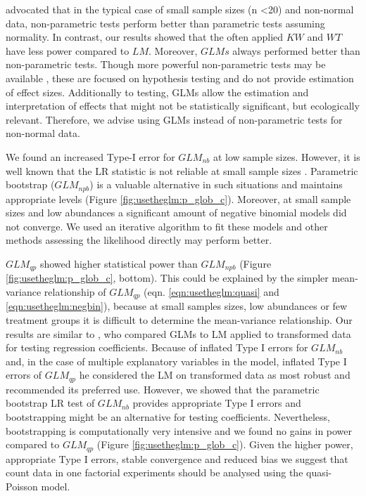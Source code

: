 \citet{wang_making_2011} advocated that in the typical case of small sample sizes (n \textless 20) and non-normal data, non-parametric tests perform better than parametric tests assuming normality.
In contrast, our results showed that the often applied $KW$ and $WT$ have less power compared to $LM$.
Moreover, $GLMs$ always performed better than non-parametric tests. 
Though more powerful non-parametric tests may be available \citep{konietschke_rank-based_2012}, these are focused on hypothesis testing and do not provide estimation of effect sizes.
Additionally to testing, GLMs allow the estimation and interpretation of effects that might not be statistically significant, but ecologically relevant.
Therefore, we advise using GLMs instead of non-parametric tests for non-normal data.

We found an increased Type-I error for $GLM_{nb}$ at low sample sizes.
However, it is well known that the LR statistic is not reliable at small sample sizes \citep{bolker_generalized_2009,wilks_large-sample_1938}.
Parametric bootstrap ($GLM_{npb}$) is a valuable alternative in such situations and maintains appropriate levels (Figure \ref{fig:usetheglm:p_glob_c}).
Moreover, at small sample sizes and low abundances a significant amount of negative binomial models did not converge.
We used an iterative algorithm to fit these models \citep{venables_modern_2002} and other methods assessing the likelihood directly may perform better.

$GLM_{qp}$ showed higher statistical power than $GLM_{npb}$ (Figure \ref{fig:usetheglm:p_glob_c}, bottom).
This could be explained by the simpler mean-variance relationship of $GLM_{qp}$ (eqn. \ref{eqn:usetheglm:quasi} and \ref{eqn:usetheglm:negbin}), because at small samples sizes, low abundances or few treatment groups it is difficult to determine the mean-variance relationship.
Our results are similar to \citet{ives_for_2015}, who compared GLMs to LM applied to transformed data for testing regression coefficients.
Because of inflated Type I errors for $GLM_{nb}$ and, in the case of multiple explanatory variables in the model, inflated Type I errors of $GLM_{qp}$ he considered the LM on transformed data as most robust and recommended its preferred use.
However, we showed that the parametric bootstrap LR test of $GLM_{nb}$ provides appropriate Type I errors and bootstrapping might be an alternative for testing coefficients.
Nevertheless, bootstrapping is computationally very intensive and we found no gains in power compared to $GLM_{qp}$ (Figure \ref{fig:usetheglm:p_glob_c}). 
Given the higher power, appropriate Type I errors, stable convergence and reduced bias \citep{ohara_not_2010} we suggest that count data in one factorial experiments should be analysed using the quasi-Poisson model.

